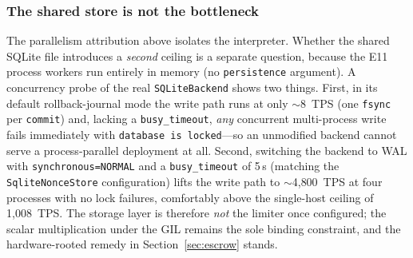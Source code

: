 \documentclass[10pt,twocolumn]{IEEEtran}
\begin{document}
\subsubsection*{The shared store is not the bottleneck}
The parallelism attribution above isolates the interpreter. Whether the
shared SQLite file introduces a \emph{second} ceiling is a separate
question, because the E11 process workers run entirely in memory (no
\texttt{persistence} argument). A concurrency probe of the real
\texttt{SQLiteBackend} shows two things. First, in its default
rollback-journal mode the write path runs at only $\sim$8~TPS (one
\texttt{fsync} per \texttt{commit}) and, lacking a
\texttt{busy\_timeout}, \emph{any} concurrent multi-process write fails
immediately with \texttt{database is locked}---so an unmodified backend
cannot serve a process-parallel deployment at all. Second, switching the
backend to WAL with \texttt{synchronous=NORMAL} and a
\texttt{busy\_timeout} of 5\,s (matching the
\texttt{SqliteNonceStore} configuration) lifts the write path to
$\sim$4{,}800~TPS at four processes with no lock failures, comfortably
above the single-host ceiling of 1{,}008~TPS. The storage layer is
therefore \emph{not} the limiter once configured; the scalar
multiplication under the GIL remains the sole binding constraint, and
the hardware-rooted remedy in Section~\ref{sec:escrow} stands.
\end{document}
